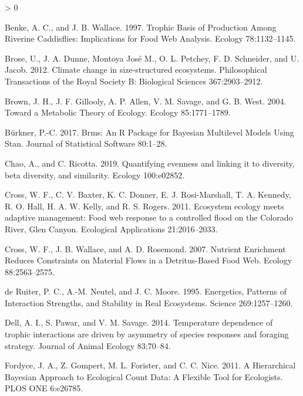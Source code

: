 \documentclass[
]{article}
\newlength{\cslhangindent}
\newenvironment{CSLReferences}[2] %
 {%
  \setlength{\parindent}{0pt}
  \ifodd #1 \everypar{\setlength{\hangindent}{\cslhangindent}}\ignorespaces\fi
  \ifnum #2 > 0
  \setlength{\parskip}{#2\baselineskip}
  \fi
 }%
 {}
\begin{document}
\begin{CSLReferences}{1}{0}
\leavevmode\hypertarget{ref-benke1997}{}%
Benke, A. C., and J. B. Wallace. 1997. Trophic {Basis} of {Production
Among Riverine Caddisflies}: {Implications} for {Food Web Analysis}.
Ecology 78:1132--1145.

\leavevmode\hypertarget{ref-brose2012}{}%
Brose, U., J. A. Dunne, Montoya José M., O. L. Petchey, F. D. Schneider,
and U. Jacob. 2012. Climate change in size-structured ecosystems.
Philosophical Transactions of the Royal Society B: Biological Sciences
367:2903--2912.

\leavevmode\hypertarget{ref-brown2004}{}%
Brown, J. H., J. F. Gillooly, A. P. Allen, V. M. Savage, and G. B. West.
2004. Toward a {Metabolic Theory} of {Ecology}. Ecology 85:1771--1789.

\leavevmode\hypertarget{ref-burkner2017}{}%
Bürkner, P.-C. 2017. Brms: {An R Package} for {Bayesian Multilevel
Models Using Stan}. Journal of Statistical Software 80:1--28.

\leavevmode\hypertarget{ref-chao2019}{}%
Chao, A., and C. Ricotta. 2019. Quantifying evenness and linking it to
diversity, beta diversity, and similarity. Ecology 100:e02852.

\leavevmode\hypertarget{ref-cross2011}{}%
Cross, W. F., C. V. Baxter, K. C. Donner, E. J. Rosi-Marshall, T. A.
Kennedy, R. O. Hall, H. A. W. Kelly, and R. S. Rogers. 2011. Ecosystem
ecology meets adaptive management: Food web response to a controlled
flood on the {Colorado River}, {Glen Canyon}. Ecological Applications
21:2016--2033.

\leavevmode\hypertarget{ref-cross2007}{}%
Cross, W. F., J. B. Wallace, and A. D. Rosemond. 2007. Nutrient
{Enrichment Reduces Constraints} on {Material Flows} in a
{Detritus}-{Based Food Web}. Ecology 88:2563--2575.

\leavevmode\hypertarget{ref-deruiter1995}{}%
de Ruiter, P. C., A.-M. Neutel, and J. C. Moore. 1995. Energetics,
{Patterns} of {Interaction Strengths}, and {Stability} in {Real
Ecosystems}. Science 269:1257--1260.

\leavevmode\hypertarget{ref-dell2014}{}%
Dell, A. I., S. Pawar, and V. M. Savage. 2014. Temperature dependence of
trophic interactions are driven by asymmetry of species responses and
foraging strategy. Journal of Animal Ecology 83:70--84.

\leavevmode\hypertarget{ref-fordyce2011}{}%
Fordyce, J. A., Z. Gompert, M. L. Forister, and C. C. Nice. 2011. A
{Hierarchical Bayesian Approach} to {Ecological Count Data}: {A Flexible
Tool} for {Ecologists}. PLOS ONE 6:e26785.


\end{CSLReferences}
\end{document}
